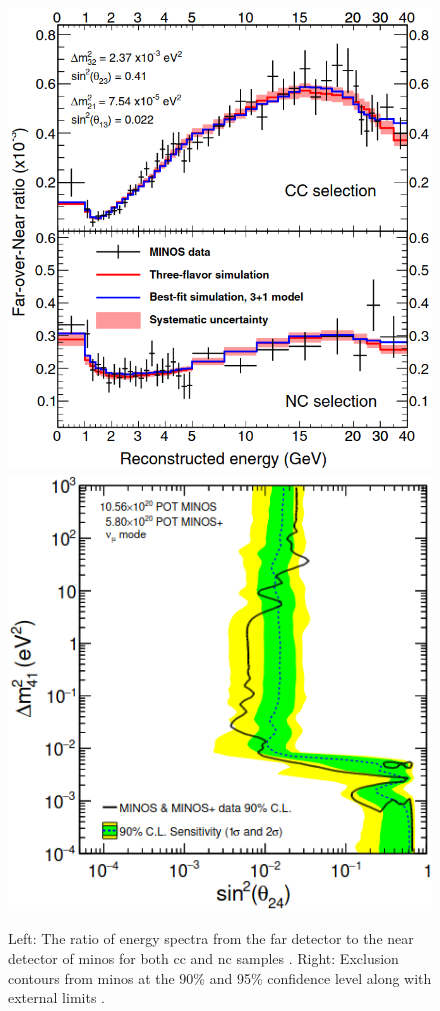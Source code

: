\begin{figure}[h!]
    \centering
    \includegraphics[width = \smallfigwidth, height = 1.1\smallfigwidth]{figures-chap2/minos_spectra.png}
    \includegraphics[width = \smallfigwidth, height = 1.1\smallfigwidth]{figures-chap2/numu_disapp_Minos.png}
    \caption[Ratio of energy spectra in the far and near detector of \gls{minos} plus exclusion contours ($\sin^2{\theta_{24}}$, $\Delta m^2_{41}$) space.]{Left: The ratio of energy spectra from the far detector to the near detector of \gls{minos} for both \gls{cc} and \gls{nc} samples \cite{MINOS}. Right: Exclusion contours from \gls{minos} at the 90\% and 95\% confidence level along with external limits \cite{MINOS_numu_disapp_contour}.}
    \label{fig:minos_spectra_contour}
\end{figure}

